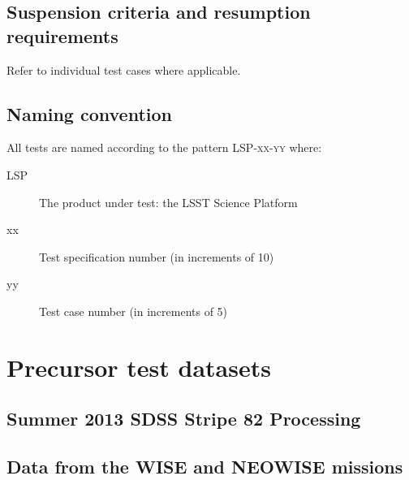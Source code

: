 \documentclass[DM,STS,toc]{lsstdoc}
\begin{document}
\subsection{Suspension criteria and resumption requirements}
\label{suspension}

Refer to individual test cases where applicable.

\subsection{Naming convention}

All tests are named according to the pattern \textsc{LSP-xx-yy} where:

\begin{description}

  \item[LSP]{The product under test: the LSST Science Platform}
  \item[xx]{Test specification number (in increments of 10)}
  \item[yy]{Test case number (in increments of 5)}

\end{description}




\appendix

\section{Precursor test datasets}

\subsection{Summer 2013 SDSS Stripe 82 Processing}

\subsection{Data from the WISE and NEOWISE missions}
\end{document}
